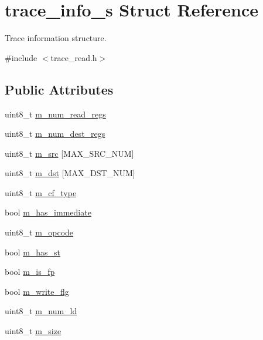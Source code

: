 \hypertarget{structtrace__info__s}{
\section{trace\_\-info\_\-s Struct Reference}
\label{structtrace__info__s}
}


Trace information structure.  




{\ttfamily \#include $<$trace\_\-read.h$>$}

\subsection*{Public Attributes}
\begin{DoxyCompactItemize}
\item 
uint8\_\-t \hyperlink{structtrace__info__s_aefe11a7ef0dab22fea0c6d7602938b67}{m\_\-num\_\-read\_\-regs}
\item 
uint8\_\-t \hyperlink{structtrace__info__s_a2d250544eb2d81da6b644b33101ef76e}{m\_\-num\_\-dest\_\-regs}
\item 
uint8\_\-t \hyperlink{structtrace__info__s_a4aa9dacb8b90ff9b43c6dd8109b91a8b}{m\_\-src} \mbox{[}MAX\_\-SRC\_\-NUM\mbox{]}
\item 
uint8\_\-t \hyperlink{structtrace__info__s_ae15595e37727861d3722eb4525bfee85}{m\_\-dst} \mbox{[}MAX\_\-DST\_\-NUM\mbox{]}
\item 
uint8\_\-t \hyperlink{structtrace__info__s_a61c3b52e6ea810848586a23c238bf67a}{m\_\-cf\_\-type}
\item 
bool \hyperlink{structtrace__info__s_a6e9e5fde0737c4e51ce33a6496b25a70}{m\_\-has\_\-immediate}
\item 
uint8\_\-t \hyperlink{structtrace__info__s_a1e2ea83d02f81c7d689163e0f208df0b}{m\_\-opcode}
\item 
bool \hyperlink{structtrace__info__s_a2a7aac8fd68b989cc00b99c1a983717f}{m\_\-has\_\-st}
\item 
bool \hyperlink{structtrace__info__s_ac504bfb834947ca4af12b22a70a16231}{m\_\-is\_\-fp}
\item 
bool \hyperlink{structtrace__info__s_ac3d6c1d7e81fa33ed2b46e87ed6a0ed7}{m\_\-write\_\-flg}
\item 
uint8\_\-t \hyperlink{structtrace__info__s_aea4eee2fbd949de38c9df8645e061535}{m\_\-num\_\-ld}
\item 
uint8\_\-t \hyperlink{structtrace__info__s_af246dd2207021ddead1cd63178952876}{m\_\-size}
\item 

\end{DoxyCompactItemize}
